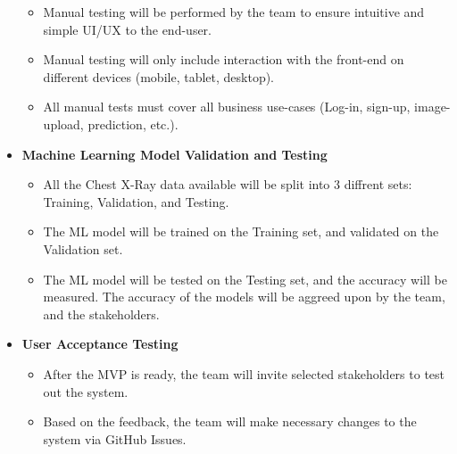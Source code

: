 \documentclass[12pt, titlepage]{article}
\begin{document}
\begin{itemize}
\begin{itemize}
    \item{Manual testing will be performed by the team to ensure intuitive and simple UI/UX to the end-user.}
    \item{Manual testing will only include interaction with the front-end on different devices (mobile, tablet, desktop).}
    \item{All manual tests must cover all business use-cases (Log-in, sign-up, image-upload, prediction, etc.).}
  \end{itemize}
  \item{\textbf{Machine Learning Model Validation and Testing}}
  \begin{itemize}
    \item{All the Chest X-Ray data available will be split into 3 diffrent sets: Training, Validation, and Testing.}
    \item{The ML model will be trained on the Training set, and validated on the Validation set.}
    \item{The ML model will be tested on the Testing set, and the accuracy will be measured. The accuracy of the models will be aggreed upon by the team, and the stakeholders.}
  \end{itemize}
  \item{\textbf{User Acceptance Testing}}
  \begin{itemize}
    \item{After the MVP is ready, the team will invite selected stakeholders to test out the system.}
    \item{Based on the feedback, the team will make necessary changes to the system via GitHub Issues.}
  \end{itemize}
\end{itemize}
\end{document}
